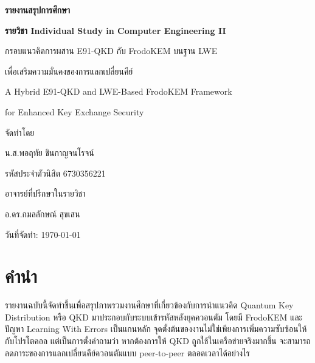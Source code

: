 \documentclass[14pt,a4paper]{extarticle}
\newcommand{\eng}[1]{\textenglish{#1}}
\begin{document}
\begin{titlepage}
    \centering
    \vspace*{2.0cm}
    {\Large \textbf{รายงานสรุปการศึกษา}\par}
    \vspace{-0.1cm}
    {\textbf{\Large รายวิชา \eng{Individual Study in Computer Engineering II}}\par}

    \vspace{3cm}
    {\large กรอบแนวคิดการผสาน \eng{E91-QKD} กับ \eng{FrodoKEM} บนฐาน \eng{LWE}\par}
    \vspace{-0.2cm}
    {\large เพื่อเสริมความมั่นคงของการแลกเปลี่ยนคีย์\par}
    \vspace{0.2cm}
    {\large \eng{A Hybrid E91-QKD and LWE-Based FrodoKEM Framework}\par}
    \vspace{-0.2cm}
    {\large \eng{for Enhanced Key Exchange Security}\par}

    \vspace{2.0cm}
    {\large จัดทำโดย\par}
    \vspace{0.45cm}
    {\large น.ส.พอฤทัย ชินกาญจนโรจน์\par}
    \vspace{-0.2cm}
    {\large รหัสประจำตัวนิสิต 6730356221\par}
    
      \vspace{1.5cm}
    {\large อาจารย์ที่ปรึกษาในรายวิชา\par}
    \vspace{0.1cm}
    {\large อ.ดร.กมลลักษณ์ สุขเสน\par}

    \vfill
    {\large วันที่จัดทำ: \today\par}
\end{titlepage}

\section*{คำนำ}
รายงานฉบับนี้จัดทำขึ้นเพื่อสรุปภาพรวมงานศึกษาที่เกี่ยวข้องกับการนำแนวคิด \eng{Quantum Key Distribution} หรือ \eng{QKD} มาประกอบกับระบบเข้ารหัสหลังยุคควอนตัม โดยมี \eng{FrodoKEM} และปัญหา \eng{Learning With Errors} เป็นแกนหลัก จุดตั้งต้นของงานไม่ใช่เพียงการเพิ่มความซับซ้อนให้กับโปรโตคอล แต่เป็นการตั้งคำถามว่า หากต้องการให้ QKD ถูกใช้ในเครือข่ายจริงมากขึ้น จะสามารถลดภาระของการแลกเปลี่ยนคีย์ควอนตัมแบบ \eng{peer-to-peer} ตลอดเวลาได้อย่างไร
\end{document}
